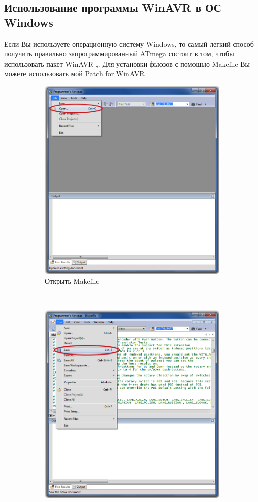 \newpage

\subsection{Использование программы WinAVR в ОС Windows}
Если Вы используете операционную систему Windows, то самый легкий способ получить правильно запрограммированный ATmega 
состоит в том, чтобы использовать пакет WinAVR \cite{winavr1},\cite{winavr2}.
Для установки фьюзов с помощью Makefile Вы можете использовать мой Patch for WinAVR  \cite{winavr3}
\begin{figure}[H]
  \begin{subfigure}[b]{.5\textwidth}
    \centering
    \includegraphics[width=.85\textwidth]{../PNG/Notepad_open.png}
    \caption{Открыть Makefile}
  \end{subfigure}
  ~
  \begin{subfigure}[b]{.5\textwidth}
    \centering
    \includegraphics[width=.85\textwidth]{../PNG/Notepad_save.png}

\end{subfigure}
\end{figure}
